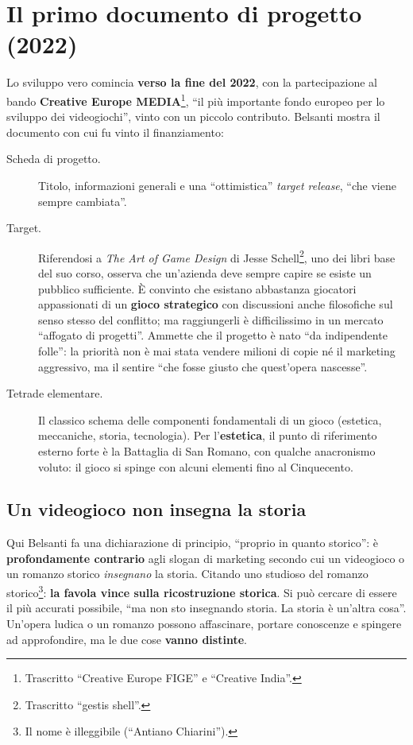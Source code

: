 \section{Il primo documento di progetto (2022)}
\label{sec:c1-2-documento}

Lo sviluppo vero comincia \textbf{verso la fine del 2022}, con la
partecipazione al bando \textbf{Creative Europe MEDIA}\footnote{Trascritto
``Creative Europe FIGE'' e ``Creative India''.}, ``il più importante fondo
europeo per lo sviluppo dei videogiochi'', vinto con un piccolo contributo.
Belsanti mostra il documento con cui fu vinto il finanziamento:
\begin{description}
  \item[Scheda di progetto.] Titolo, informazioni generali e una
        ``ottimistica'' \emph{target release}, ``che viene sempre cambiata''.
  \item[Target.] Riferendosi a \emph{The Art of Game Design} di Jesse
        Schell\footnote{Trascritto ``gestis shell''.}, uno dei libri base del suo
        corso, osserva che un'azienda deve sempre capire se esiste un pubblico
        sufficiente. È convinto che esistano abbastanza giocatori appassionati
        di un \textbf{gioco strategico} con discussioni anche filosofiche sul
        senso stesso del conflitto; ma raggiungerli è difficilissimo in un mercato
        ``affogato di progetti''. Ammette che il progetto è nato ``da
        indipendente folle'': la priorità non è mai stata vendere milioni di
        copie né il marketing aggressivo, ma il sentire ``che fosse giusto che
        quest'opera nascesse''.
  \item[Tetrade elementare.] Il classico schema delle componenti fondamentali
        di un gioco (estetica, meccaniche, storia, tecnologia). Per
        l'\textbf{estetica}, il punto di riferimento esterno forte è la
        Battaglia di San Romano, con qualche anacronismo voluto: il gioco si
        spinge con alcuni elementi fino al Cinquecento.
\end{description}

\subsection{Un videogioco non insegna la storia}

Qui Belsanti fa una dichiarazione di principio, ``proprio in quanto storico'':
è \textbf{profondamente contrario} agli slogan di marketing secondo cui un
videogioco o un romanzo storico \emph{insegnano} la storia. Citando uno
studioso del romanzo storico\footnote{Il nome è illeggibile (``Antiano
Chiarini'').}: \textbf{la favola vince sulla ricostruzione storica}. Si può
cercare di essere il più accurati possibile, ``ma non sto insegnando storia. La
storia è un'altra cosa''. Un'opera ludica o un romanzo possono affascinare,
portare conoscenze e spingere ad approfondire, ma le due cose \textbf{vanno
distinte}.


